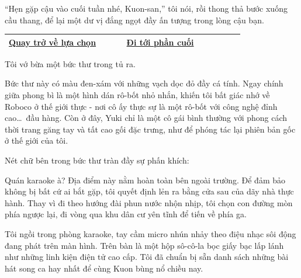 \documentclass[../main.tex]{subfiles}
\begin{document}
``Hẹn gặp cậu vào cuối tuần nhé, Kuon-san,'' tôi nói, rồi thong thả bước xuống cầu thang, để lại một dư vị đắng ngọt đầy ấn tượng trong lòng cậu bạn.

\begin{table}[H]
  \centering
  \setlength{\arrayrulewidth}{1pt}
  \begin{tabular}{|>{\centering\arraybackslash}p{0.4\linewidth}|>{\centering\arraybackslash}p{0.4\linewidth}|}
    \hline
    \hyperref[choice]{Quay trở về lựa chọn} & \hyperref[ending]{Đi tới phần cuối} \\ \hline
  \end{tabular}
\end{table}

\newpage
\label{yuki}


Tôi vớ bừa một bức thư trong tủ ra.

Bức thư này có màu đen-xám với những vạch dọc đỏ đầy cá tính. Ngay chính giữa phong bì là một hình dán rô-bốt nhỏ nhắn, khiến tôi bất giác nhớ về Roboco ở thế giới thực - nơi cô ấy thực sự là một rô-bốt với công nghệ đỉnh cao\dots\ đầu hàng. Còn ở đây, Yuki chỉ là một cô gái bình thường với phong cách thời trang găng tay và tất cao gối đặc trưng, như để phóng tác lại phiên bản gốc ở thế giới của tôi.

Nét chữ bên trong bức thư tràn đầy sự phấn khích:


Quán karaoke à? Địa điểm này nằm hoàn toàn bên ngoài trường. Để đảm bảo không bị bất cứ ai bắt gặp, tôi quyết định lẻn ra bằng cửa sau của dãy nhà thực hành. Thay vì đi theo hướng đài phun nước nhộn nhịp, tôi chọn con đường mòn phía ngược lại, đi vòng qua khu dân cư yên tĩnh để tiến về phía ga.

\ct


Tôi ngồi trong phòng karaoke, tay cầm micro nhún nhảy theo điệu nhạc sôi động đang phát trên màn hình. Trên bàn là một hộp sô-cô-la bọc giấy bạc lấp lánh như những linh kiện điện tử cao cấp. Tôi đã chuẩn bị sẵn danh sách những bài hát song ca hay nhất để cùng Kuon bùng nổ chiều nay.
\end{document}
